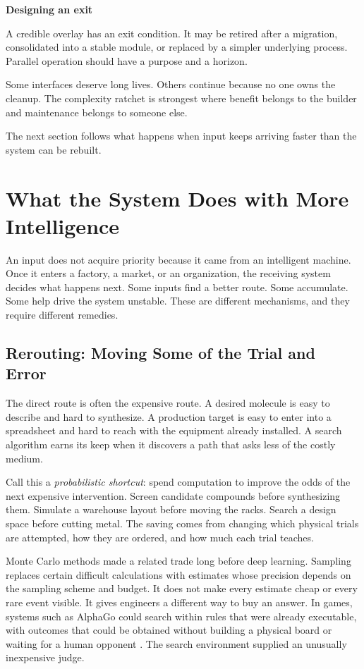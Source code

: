 \documentclass[11pt,openany]{book}
\newcommand{\subhead}[1]{\par\medskip\noindent\textbf{#1}\par\nobreak\smallskip}
\begin{document}
\subhead{Designing an exit}

A credible overlay has an exit condition. It may be retired after a migration, consolidated into a stable module, or replaced by a simpler underlying process. Parallel operation should have a purpose and a horizon.

Some interfaces deserve long lives. Others continue because no one owns the cleanup. The complexity ratchet is strongest where benefit belongs to the builder and maintenance belongs to someone else.

The next section follows what happens when input keeps arriving faster than the system can be rebuilt.

\section{What the System Does with More Intelligence}

An input does not acquire priority because it came from an intelligent machine. Once it enters a factory, a market, or an organization, the receiving system decides what happens next. Some inputs find a better route. Some accumulate. Some help drive the system unstable. These are different mechanisms, and they require different remedies.

\subsection{Rerouting: Moving Some of the Trial and Error}

The direct route is often the expensive route. A desired molecule is easy to describe and hard to synthesize. A production target is easy to enter into a spreadsheet and hard to reach with the equipment already installed. A search algorithm earns its keep when it discovers a path that asks less of the costly medium.

Call this a \emph{probabilistic shortcut}: spend computation to improve the odds of the next expensive intervention. Screen candidate compounds before synthesizing them. Simulate a warehouse layout before moving the racks. Search a design space before cutting metal. The saving comes from changing which physical trials are attempted, how they are ordered, and how much each trial teaches.

Monte Carlo methods made a related trade long before deep learning. Sampling replaces certain difficult calculations with estimates whose precision depends on the sampling scheme and budget. It does not make every estimate cheap or every rare event visible. It gives engineers a different way to buy an answer. In games, systems such as AlphaGo could search within rules that were already executable, with outcomes that could be obtained without building a physical board or waiting for a human opponent \cite{silver2016mastering}. The search environment supplied an unusually inexpensive judge.
\end{document}
